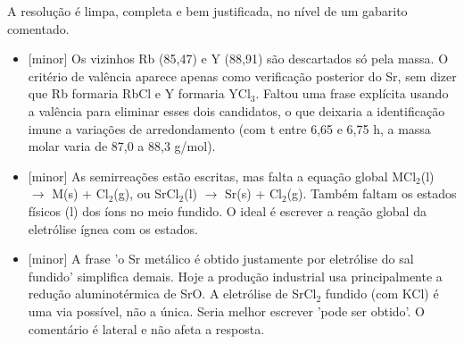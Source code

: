 \documentclass{article}%
\begin{document}
\newline%
A resolução é limpa, completa e bem justificada, no nível de um gabarito comentado.%
\begin{itemize}%
\item%
{[}minor{]} Os vizinhos Rb (85,47) e Y (88,91) são descartados só pela massa. O critério de valência aparece apenas como verificação posterior do Sr, sem dizer que Rb formaria RbCl e Y formaria YCl$_{3}$. Faltou uma frase explícita usando a valência para eliminar esses dois candidatos, o que deixaria a identificação imune a variações de arredondamento (com t entre 6,65 e 6,75 h, a massa molar varia de 87,0 a 88,3 g/mol).%
\item%
{[}minor{]} As semirreações estão escritas, mas falta a equação global MCl$_{2}$(l) $\to$ M(s) + Cl$_{2}$(g), ou SrCl$_{2}$(l) $\to$ Sr(s) + Cl$_{2}$(g). Também faltam os estados físicos (l) dos íons no meio fundido. O ideal é escrever a reação global da eletrólise ígnea com os estados.%
\item%
{[}minor{]} A frase 'o Sr metálico é obtido justamente por eletrólise do sal fundido' simplifica demais. Hoje a produção industrial usa principalmente a redução aluminotérmica de SrO. A eletrólise de SrCl$_{2}$ fundido (com KCl) é uma via possível, não a única. Seria melhor escrever 'pode ser obtido'. O comentário é lateral e não afeta a resposta.%
\end{itemize}%
\end{document}
